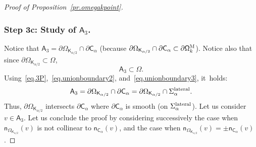 \documentclass[10pt]{amsart}
\let\pa\partial
\theoremstyle{plain}
\theoremstyle{definition}
\begin{document}
\begin{proof}[Proof of Proposition~\ref{pr.omegakpoint}]
\subsubsection*{Step 3c: Study of $\mathsf A_3$. }
Notice that $\mathsf A_3=\partial \Omega_{\mathsf K_{\alpha/2}}\cap \pa \mathsf C_\alpha$ (because $\partial \Omega_{\mathsf K_{\alpha/2}}\cap \pa \mathsf C_\alpha\subset \pa \mathsf \Omega_k^{\textsc{M}}$). Notice also that since $\partial \Omega_{\mathsf K_{\alpha/2}}\subset \Omega$,
\begin{equation}\label{eq.A3}
\mathsf A_3 \subset \Omega.
\end{equation}
Using~\eqref{eq.3P},~\eqref{eq.unionboundary2}, and~\eqref{eq.unionboundary3}, it~holds:
\begin{equation}\label{eq.A3-lateral}
\mathsf A_3= \partial \Omega_{\mathsf K_{\alpha/2}}\cap \pa \mathsf C_\alpha =\partial \Omega_{\mathsf K_{\alpha/2}}\cap \Sigma_\alpha^{\textup{lateral}}.
\end{equation}
Thus, $ \partial \Omega_{\mathsf K_{\alpha/2}}$ intersects $ \pa \mathsf C_\alpha$ where $\pa \mathsf C_\alpha$ is smooth (\ie on $\Sigma_\alpha^{\textup{lateral}}$).
Let us consider $v\in \mathsf A_3$. Let us conclude the proof by
considering successively the case when $\mathsf n_{\Omega_{\mathsf
K_{\alpha/2}}}(v)$ is not collinear to $\mathsf n_{\mathsf
C_\alpha}(v)$, and the case when $\mathsf n_{\Omega_{\mathsf K_{\alpha/2}}}(v)=\pm \mathsf n_{\mathsf C_\alpha}(v)$.


\end{proof}
\end{document}
